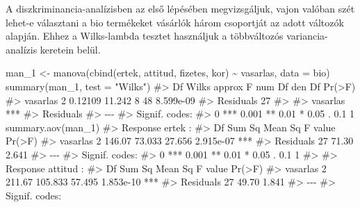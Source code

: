 \documentclass[
  letterpaper,
]{krantz}
\makeatletter
\newenvironment{Shaded}{\begin{snugshade}}{\end{snugshade}}
\newcommand{\AttributeTok}[1]{\textcolor[rgb]{0.40,0.45,0.13}{#1}}
\newcommand{\CommentTok}[1]{\textcolor[rgb]{0.37,0.37,0.37}{#1}}
\newcommand{\FunctionTok}[1]{\textcolor[rgb]{0.28,0.35,0.67}{#1}}
\newcommand{\NormalTok}[1]{\textcolor[rgb]{0.00,0.23,0.31}{#1}}
\newcommand{\OtherTok}[1]{\textcolor[rgb]{0.00,0.23,0.31}{#1}}
\newcommand{\SpecialCharTok}[1]{\textcolor[rgb]{0.37,0.37,0.37}{#1}}
\newcommand{\StringTok}[1]{\textcolor[rgb]{0.13,0.47,0.30}{#1}}
\newenvironment{kframe}{%
\medskip{}
\setlength{\fboxsep}{.8em}
 \def\at@end@of@kframe{}%
 \ifinner\ifhmode%
  \def\at@end@of@kframe{\end{minipage}}%
  \begin{minipage}{\columnwidth}%
 \fi\fi%
 \def\FrameCommand##1{\hskip\@totalleftmargin \hskip-\fboxsep
 \colorbox{shadecolor}{##1}\hskip-\fboxsep
     \hskip-\linewidth \hskip-\@totalleftmargin \hskip\columnwidth}%
 \MakeFramed {\advance\hsize-\width
   \@totalleftmargin\z@ \linewidth\hsize
   \@setminipage}}%
 {\par\unskip\endMakeFramed%
 \at@end@of@kframe}
\renewenvironment{Shaded}{\begin{kframe}}{\end{kframe}}
\makeatother
\begin{document}
A diszkriminancia-analízisben az első lépésében megvizsgáljuk, vajon
valóban szét lehet-e választani a bio termékeket vásárlók három
csoportját az adott változók alapján. Ehhez a Wilks-lambda tesztet
használjuk a többváltozós variancia-analízis keretein belül.

\begin{Shaded}
\begin{Highlighting}[]
\NormalTok{man\_1 }\OtherTok{\textless{}{-}} \FunctionTok{manova}\NormalTok{(}\FunctionTok{cbind}\NormalTok{(ertek, attitud, fizetes, kor) }\SpecialCharTok{\textasciitilde{}}\NormalTok{ vasarlas,}
    \AttributeTok{data =}\NormalTok{ bio)}
\FunctionTok{summary}\NormalTok{(man\_1, }\AttributeTok{test =} \StringTok{"Wilks"}\NormalTok{)}
\CommentTok{\#\textgreater{}           Df   Wilks approx F num Df den Df    Pr(\textgreater{}F)}
\CommentTok{\#\textgreater{} vasarlas   2 0.12109   11.242      8     48 8.599e{-}09}
\CommentTok{\#\textgreater{} Residuals 27                                         }
\CommentTok{\#\textgreater{}              }
\CommentTok{\#\textgreater{} vasarlas  ***}
\CommentTok{\#\textgreater{} Residuals    }
\CommentTok{\#\textgreater{} {-}{-}{-}}
\CommentTok{\#\textgreater{} Signif. codes:  }
\CommentTok{\#\textgreater{} 0 \textquotesingle{}***\textquotesingle{} 0.001 \textquotesingle{}**\textquotesingle{} 0.01 \textquotesingle{}*\textquotesingle{} 0.05 \textquotesingle{}.\textquotesingle{} 0.1 \textquotesingle{} \textquotesingle{} 1}
\FunctionTok{summary.aov}\NormalTok{(man\_1)}
\CommentTok{\#\textgreater{}  Response ertek :}
\CommentTok{\#\textgreater{}             Df Sum Sq Mean Sq F value    Pr(\textgreater{}F)    }
\CommentTok{\#\textgreater{} vasarlas     2 146.07  73.033  27.656 2.915e{-}07 ***}
\CommentTok{\#\textgreater{} Residuals   27  71.30   2.641                      }
\CommentTok{\#\textgreater{} {-}{-}{-}}
\CommentTok{\#\textgreater{} Signif. codes:  }
\CommentTok{\#\textgreater{} 0 \textquotesingle{}***\textquotesingle{} 0.001 \textquotesingle{}**\textquotesingle{} 0.01 \textquotesingle{}*\textquotesingle{} 0.05 \textquotesingle{}.\textquotesingle{} 0.1 \textquotesingle{} \textquotesingle{} 1}
\CommentTok{\#\textgreater{} }
\CommentTok{\#\textgreater{}  Response attitud :}
\CommentTok{\#\textgreater{}             Df Sum Sq Mean Sq F value    Pr(\textgreater{}F)    }
\CommentTok{\#\textgreater{} vasarlas     2 211.67 105.833  57.495 1.853e{-}10 ***}
\CommentTok{\#\textgreater{} Residuals   27  49.70   1.841                      }
\CommentTok{\#\textgreater{} {-}{-}{-}}
\CommentTok{\#\textgreater{} Signif. codes:  }

\end{Highlighting}
\end{Shaded}
\end{document}
